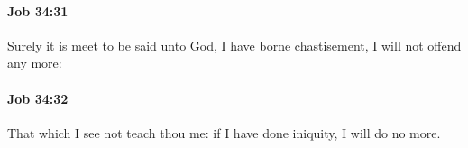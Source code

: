 		\paragraph{Job 34:31} %
			\label{JOB-34-31}

			Surely it is meet to be said unto God, I have borne chastisement, I will not offend any more:


		\paragraph{Job 34:32} %
			\label{JOB-34-32}

			That which I see not teach thou me: if I have done iniquity, I will do no more.



